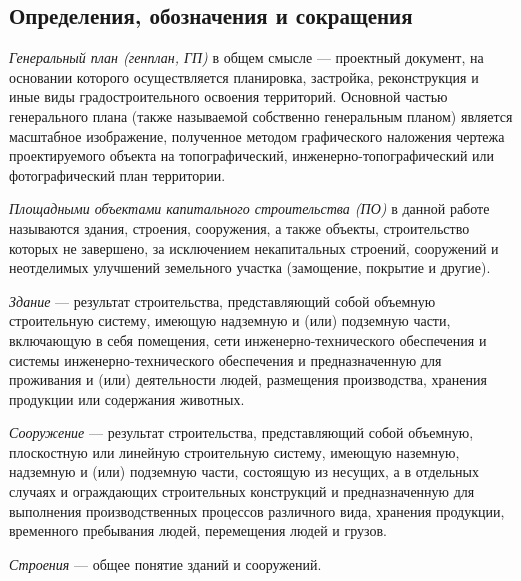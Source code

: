\newpage
\subsection*{\Large{Определения, обозначения и сокращения}}

\par
\textit{Генеральный план (генплан, ГП)} в общем смысле —
проектный документ, на основании которого осуществляется планировка,
застройка, реконструкция и иные виды градостроительного освоения территорий.
Основной частью генерального плана (также называемой собственно генеральным планом)
является масштабное изображение, полученное методом графического наложения чертежа
проектируемого объекта на топографический,
инженерно-топографический или фотографический план территории.

\par
\textit{Площадными объектами капитального строительства (ПО)} в данной работе называются
здания, строения, сооружения, а также объекты, строительство которых не завершено, за исключением некапитальных строений,
сооружений и неотделимых улучшений земельного участка (замощение, покрытие и другие).
\par
\textit{Здание} — результат строительства, представляющий собой объемную строительную систему,
имеющую надземную и (или) подземную части, включающую в себя помещения,
сети инженерно-технического обеспечения и системы инженерно-технического обеспечения и предназначенную для проживания и
(или) деятельности людей, размещения производства, хранения продукции или содержания животных.
\par
\textit{Сооружение} — результат строительства,
представляющий собой объемную, плоскостную или линейную строительную систему,
имеющую наземную, надземную и (или) подземную части, состоящую из несущих,
а в отдельных случаях и ограждающих строительных конструкций и предназначенную для выполнения
производственных процессов различного вида, хранения продукции, временного пребывания людей, перемещения людей и грузов.
\par
\textit{Строения} — общее понятие зданий и сооружений.
